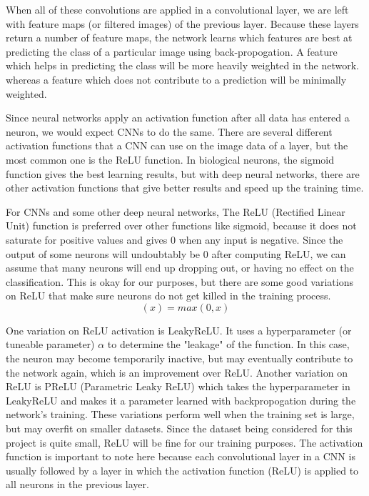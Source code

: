 \documentclass[12pt]{article} %
\begin{document}
	When all of these convolutions are applied in a convolutional layer, we are left with feature maps (or filtered images) of the previous layer. Because these layers return a number of feature maps, the network learns which features are best at predicting the class of a particular image using back-propogation. A feature which helps in predicting the class will be more heavily weighted in the network. whereas a feature which does not contribute to a prediction will be minimally weighted.
	
	Since neural networks apply an activation function after all data has entered a neuron, we would expect CNNs to do the same. There are several different activation functions that a CNN can use on the image data of a layer, but the most common one is the ReLU function. In biological neurons, the sigmoid function gives the best learning results, but with deep neural networks, there are other activation functions that give better results and speed up the training time.\cite{krizhevsky2012imagenet} 
	
	For CNNs and some other deep neural networks, The ReLU (Rectified Linear Unit) function is preferred over other functions like sigmoid, because it does not saturate for positive values and gives 0 when any input is negative. Since the output of some neurons will undoubtably be 0 after computing ReLU, we can assume that many neurons will end up dropping out, or having no effect on the classification. This is okay for our purposes, but there are some good variations on ReLU that make sure neurons do not get killed in the training process. \cite{aurelienMachineLearning} 
 \begin{equation}	
 (x) = max(0, x)%
 \end{equation}
 
	One variation on ReLU activation is LeakyReLU. It uses a hyperparameter (or tuneable parameter) \( \alpha \) to determine the "leakage" of the function. In this case, the neuron may become temporarily inactive, but may eventually contribute to the network again, which is an improvement over ReLU. Another variation on ReLU is PReLU (Parametric Leaky ReLU) which takes the hyperparameter in LeakyReLU and makes it a parameter learned with backpropogation during the network's training. These variations perform well when the training set is large, but may overfit on smaller datasets. Since the dataset being considered for this project is quite small, ReLU will be fine for our training purposes. The activation function is important to note here because each convolutional layer in a CNN is usually followed by a layer in which the activation function (ReLU) is applied to all neurons in the previous layer.\cite{aurelienMachineLearning} 
 
\end{document}
